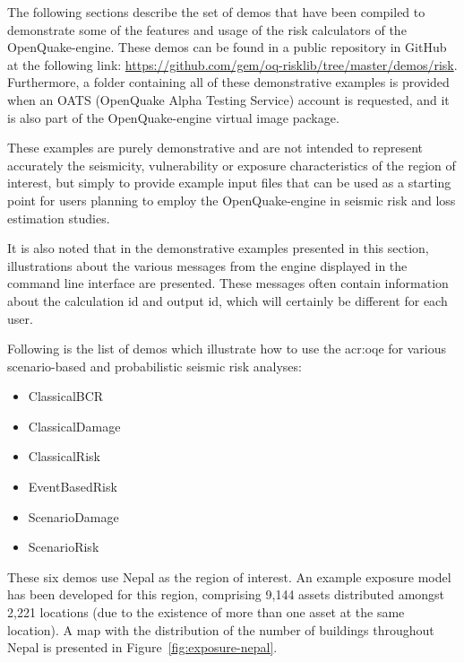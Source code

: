The following sections describe the set of demos that have been compiled to
demonstrate some of the features and usage of the risk calculators of the
OpenQuake-engine. These demos can be found in a public repository in GitHub at
the following link:
\href{https://github.com/gem/oq-risklib/tree/master/demos/risk}
{https://github.com/gem/oq-risklib/tree/master/demos/risk}.
Furthermore, a folder containing all of these
demonstrative examples is provided when an OATS (OpenQuake Alpha Testing
Service) account is requested, and it is also part of the OpenQuake-engine
virtual image package.

These examples are purely demonstrative and are not intended to represent
accurately the seismicity, vulnerability or exposure characteristics of the
region of interest, but simply to provide example input files that can be used
as a starting point for users planning to employ the OpenQuake-engine in seismic
risk and loss estimation studies.

It is also noted that in the demonstrative examples presented in this section,
illustrations about the various messages from the engine displayed in the
command line interface are presented. These messages often contain information
about the calculation id and output id, which will certainly be different for
each user.

Following is the list of demos which illustrate how to use the \gls{acr:oqe} for
various scenario-based and probabilistic seismic risk analyses:

\begin{itemize}

    \item ClassicalBCR
	\item ClassicalDamage
    \item ClassicalRisk
    \item EventBasedRisk
    \item ScenarioDamage
    \item ScenarioRisk

\end{itemize}

These six demos use Nepal as the region of interest. An example \gls{exposure
model} has been developed for this region, comprising 9,144 assets distributed
amongst 2,221 locations (due to the existence of more than one \gls{asset} at
the same location). A map with the distribution of the number of buildings
throughout Nepal is presented in Figure~\ref{fig:exposure-nepal}.

